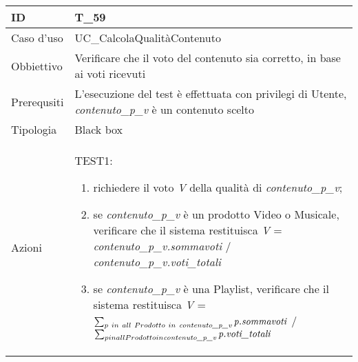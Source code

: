 \begin{table}[hb]
    \centering
    \begin{tabular}{ |p{2cm}|p{10cm}|  }
        \hline
        ID          & T\_59                                                                              \\\hline
        Caso d'uso  & UC\_CalcolaQualitàContenuto                                                        \\\hline
        Obbiettivo  & Verificare che il voto del contenuto sia corretto, in base ai voti ricevuti        \\\hline
        Prerequsiti & L'esecuzione del test è effettuata con privilegi di Utente, \emph{contenuto\_p\_v}
        è un contenuto scelto                                                                            \\\hline
        Tipologia   & Black box                                                                          \\\hline
        Azioni      &
        TEST1:
        \begin{enumerate}[nosep, topsep=0pt]
            \item richiedere il voto \emph{V} della qualità di \emph{contenuto\_p\_v};
            \item se \emph{contenuto\_p\_v} è un prodotto Video o Musicale,
                  verificare che il sistema restituisca \emph{V} = \emph{contenuto\_p\_v.sommavoti} / \emph{contenuto\_p\_v.voti\_totali}
            \item se \emph{contenuto\_p\_v} è una Playlist,
                  verificare che il sistema restituisca \emph{V} =
                  $\sum_{p\ in\ all\ Prodotto\ in\ \emph{contenuto\_p\_v}} \emph{p.sommavoti}$
                  /
                  $\sum_{p in all Prodotto in \emph{contenuto\_p\_v}} \emph{p.voti\_totali}$
        \end{enumerate}
        \\\hline
    \end{tabular}
\end{table}

